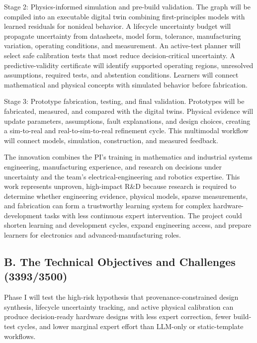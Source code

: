 \documentclass[12pt,letterpaper]{article}
\begin{document}
Stage 2: Physics-informed simulation and pre-build validation.
The graph will be compiled into an executable digital twin combining first-principles models with learned residuals for nonideal behavior. A lifecycle uncertainty budget will propagate uncertainty from datasheets, model form, tolerance, manufacturing variation, operating conditions, and measurement. An active-test planner will select safe calibration tests that most reduce decision-critical uncertainty. A predictive-validity certificate will identify supported operating regions, unresolved assumptions, required tests, and abstention conditions. Learners will connect mathematical and physical concepts with simulated behavior before fabrication.

Stage 3: Prototype fabrication, testing, and final validation.
Prototypes will be fabricated, measured, and compared with the digital twins. Physical evidence will update parameters, assumptions, fault explanations, and design choices, creating a sim-to-real and real-to-sim-to-real refinement cycle. This multimodal workflow will connect models, simulation, construction, and measured feedback.

The innovation combines the PI's training in mathematics and industrial systems engineering, manufacturing experience, and research on decisions under uncertainty
and the team's electrical-engineering and robotics expertise. This work represents unproven, high-impact R\&D because research is required to determine whether engineering evidence, physical models, sparse measurements, and fabrication can form a trustworthy learning system for complex hardware-development tasks with less continuous expert intervention. The project could shorten learning and development cycles, expand engineering access, and prepare learners for electronics and advanced-manufacturing roles.

\subsection{B. The Technical Objectives and Challenges (3393/3500)}

Phase I will test the high-risk hypothesis that provenance-constrained design synthesis, lifecycle uncertainty tracking, and active physical calibration can produce decision-ready hardware designs with less expert correction, fewer build-test cycles, and lower marginal expert effort than LLM-only or static-template workflows.
\end{document}
